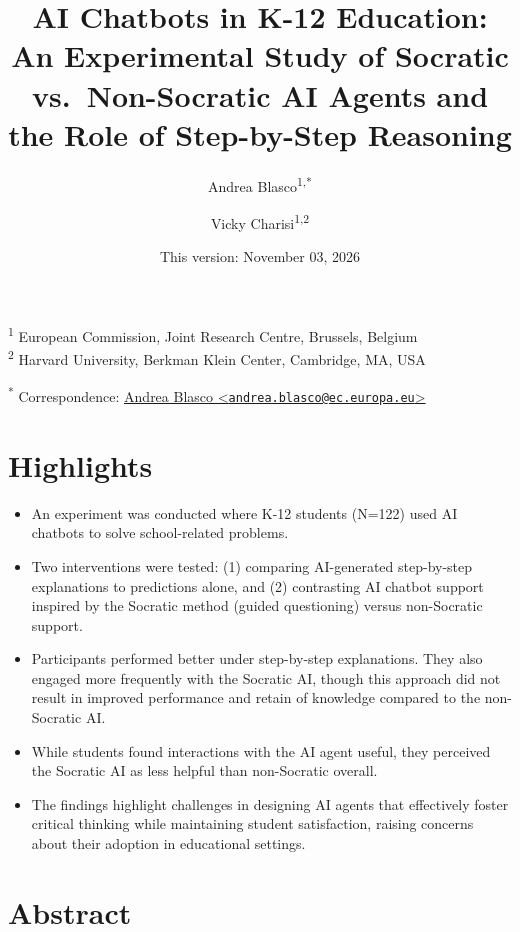 \documentclass[
  12pt,
]{article}
\title{AI Chatbots in K-12 Education: An Experimental Study of Socratic vs.~Non-Socratic AI Agents and the Role of Step-by-Step Reasoning}
\author{Andrea Blasco\textsuperscript{1,*} \and Vicky Charisi\textsuperscript{1,2}}
\date{This version: November 03, 2026}
\begin{document}
\maketitle

\textsuperscript{1} European Commission, Joint Research Centre, Brussels, Belgium\\
\textsuperscript{2} Harvard University, Berkman Klein Center, Cambridge, MA, USA

\textsuperscript{*} Correspondence: \href{mailto:andrea.blasco@ec.europa.eu}{Andrea Blasco \textless{}\href{mailto:andrea.blasco@ec.europa.eu}{\nolinkurl{andrea.blasco@ec.europa.eu}}\textgreater{}}

\clearpage

\section*{Highlights}\label{highlights}

\begin{itemize}
\item
  An experiment was conducted where K-12 students (N=122) used AI chatbots to solve school-related problems.
\item
  Two interventions were tested: (1) comparing AI-generated step-by-step explanations to predictions alone, and (2) contrasting AI chatbot support inspired by the Socratic method (guided questioning) versus non-Socratic support.
\item
  Participants performed better under step-by-step explanations. They also engaged more frequently with the Socratic AI, though this approach did not result in improved performance and retain of knowledge compared to the non-Socratic AI.
\item
  While students found interactions with the AI agent useful, they perceived the Socratic AI as less helpful than non-Socratic overall.
\item
  The findings highlight challenges in designing AI agents that effectively foster critical thinking while maintaining student satisfaction, raising concerns about their adoption in educational settings.
\end{itemize}

\clearpage

\section*{Abstract}\label{abstract}
\end{document}
